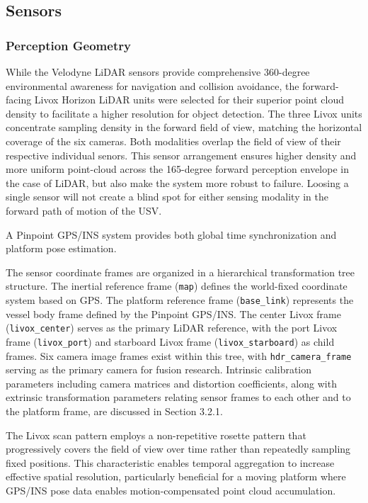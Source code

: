 \documentclass{erauthesis}
\begin{document}
        \subsection{Sensors}
        
            \subsubsection{Perception Geometry}

While the Velodyne \ac{LiDAR} sensors provide comprehensive 360-degree environmental awareness for navigation and collision avoidance, the forward-facing Livox Horizon \ac{LiDAR} units were selected for their superior point cloud density to facilitate a higher resolution for object detection.
The three Livox units concentrate sampling density in the forward field of view, matching the horizontal coverage of the six cameras.
Both modalities overlap the field of view of their respective individual senors.
This sensor arrangement ensures higher density and more uniform point-cloud across the 165-degree forward perception envelope in the case of \ac{LiDAR}, but also make the system more robust to failure.
Loosing a single sensor will not create a blind spot for either sensing modality in the forward path of motion of the \ac{USV}. 

A Pinpoint \ac{GPS}/\ac{INS} system provides both global time synchronization and platform pose estimation.

The sensor coordinate frames are organized in a hierarchical transformation tree structure.
The inertial reference frame (\texttt{map}) defines the world-fixed coordinate system based on \ac{GPS}.
The platform reference frame (\texttt{base\_link}) represents the vessel body frame defined by the Pinpoint \ac{GPS}/\ac{INS}.
The center Livox frame (\texttt{livox\_center}) serves as the primary \ac{LiDAR} reference, with the port Livox frame (\texttt{livox\_port}) and starboard Livox frame (\texttt{livox\_starboard}) as child frames.
Six camera image frames exist within this tree, with \texttt{hdr\_camera\_frame} serving as the primary camera for fusion research.
Intrinsic calibration parameters including camera matrices and distortion coefficients, along with extrinsic transformation parameters relating sensor frames to each other and to the platform frame, are discussed in Section 3.2.1.



The Livox scan pattern employs a non-repetitive rosette pattern that progressively covers the field of view over time rather than repeatedly sampling fixed positions.
This characteristic enables temporal aggregation to increase effective spatial resolution, particularly beneficial for a moving platform where \ac{GPS}/\ac{INS} pose data enables motion-compensated point cloud accumulation.
\end{document}

